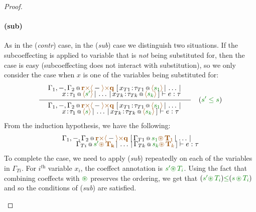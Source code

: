 \begin{proof}
\begin{itemize}
\paragraph{(sub)} As in the (\emph{contr}) case, in the (\emph{sub}) case we distinguish two situations.
If the subcoeffecting is applied to variable that is \emph{not} being substituted for, then the case is
easy (subcoeffecting does not interact with substitution), so we only consider the case when $x$ is one
of the variables being substituted for:
\[
\inference
  {{\begin{array}{l}
   \coctx{\Gamma_1,-,\Gamma_2}{\aclrd{\textbf{r}} \atimes \alift{-} \atimes \aclrd{\textbf{q}}} ~
   [\,\coctx{x_{T1}\!:\!\tau_{T1}}{\alift{\cclrd{s_1}}} \,|\, \ldots \,|\,
     \\[-0.35em] \qquad
     \coctx{x\!:\!\tau_1}{\alift{\cclrd{s'}}}
     \,|\, \ldots \,|\, \coctx{x_{Tk}\!:\!\tau_{Tk}}{\alift{\cclrd{s_k}}}\,]
   \vdash e : \tau
   \end{array}}}
  {{\begin{array}{l}
   \coctx{\Gamma_1,-,\Gamma_2}{\aclrd{\textbf{r}} \atimes \alift{-} \atimes \aclrd{\textbf{q}}} ~
   [\,\coctx{x_{T1}\!:\!\tau_{T1}}{\alift{\cclrd{s_1}}} \,|\, \ldots \,|\,
     \\[-0.35em] \qquad
     \coctx{x\!:\!\tau_1}{\alift{\cclrd{s}}}
     \,|\, \ldots \,|\, \coctx{x_{Tk}\!:\!\tau_{Tk}}{\alift{\cclrd{s_k}}}\,]
   \vdash e : \tau
   \end{array}}}
\quad(\cclrd{s'}\;\cleq\;\cclrd{s})   
\]
From the induction hypothesis, we have the following:
\[
  {{\begin{array}{l}
   \coctx{\Gamma_1,-,\Gamma_2}{\aclrd{\textbf{r}} \atimes \alift{-} \atimes \aclrd{\textbf{q}}} ~
   [\,\coctx{\Gamma_{T1}}{\cclrd{s_1}\aseq\,\aclrd{\textbf{T}_1}} \,|\, \ldots \,|\,
     \\[-0.35em] \qquad
     \coctx{\Gamma_{Ti}}{\cclrd{s'}\aseq\,\aclrd{\mathbf{T_k}} }
     \,|\, \ldots \,|\, \coctx{\Gamma_{Tk}}{\cclrd{s_k}\aseq\,\aclrd{\textbf{T}_k}}\,]
   \vdash e : \tau
   \end{array}}}
\]
To complete the case, we need to apply (\emph{sub}) repeatedly on each of the variables in 
$\Gamma_{Ti}$. For $i^{\textit{th}}$ variable $x_i$, the coeffect annotation is $\cclrd{s'}\cseq\,\cclrd{T_i}$.
Using the fact that combining coeffects with $\cseq$ preserves the ordering, we get that 
$(\cclrd{s'}\cseq\,\cclrd{T_i}) \cleq (\cclrd{s}\,\cseq\,\cclrd{T_i})$ and so the conditions
of (\emph{sub}) are satisfied.


\end{itemize}
\end{proof}
